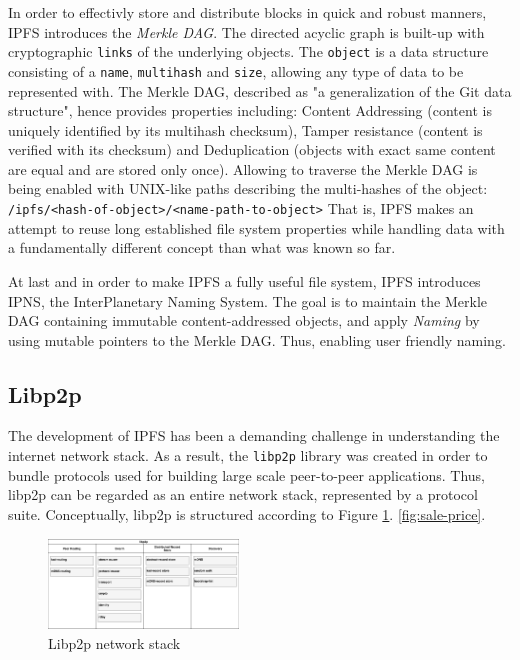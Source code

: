\documentclass[conference]{IEEEtran}
\begin{document}
In order to effectivly store and distribute blocks in quick and robust manners, IPFS introduces the \textit{Merkle DAG}.
The directed acyclic graph is built-up with cryptographic \texttt{links} of the underlying objects.
The \texttt{object} is a data structure consisting of a \texttt{name}, \texttt{multihash} and \texttt{size}, allowing any type of data to be represented with.
The Merkle DAG, described as "a generalization of the Git data structure"\cite{ipfs-whitepaper}, hence provides properties including: Content Addressing (content is uniquely identified by its multihash checksum), Tamper resistance (content is verified with its checksum) and Deduplication (objects with exact same content are equal and are stored only once). \cite{ipfs-whitepaper}
Allowing to traverse the Merkle DAG is being enabled with UNIX-like paths describing the multi-hashes of the object:\\
\texttt{/ipfs/<hash-of-object>/<name-path-to-object>}
That is, IPFS makes an attempt to reuse long established file system properties while handling data with a fundamentally different concept than what was known so far.

At last and in order to make IPFS a fully useful file system, IPFS introduces IPNS\cite{ipns}, the InterPlanetary Naming System.
The goal is to maintain the Merkle DAG containing immutable content-addressed objects, and apply \textit{Naming} by using mutable pointers to the Merkle DAG.
Thus, enabling user friendly naming. \cite{ipfs-whitepaper}

\subsection{Libp2p}
The development of IPFS has been a demanding challenge in understanding the internet network stack. \cite{libp2p-github}
As a result, the \texttt{libp2p} library was created in order to bundle protocols used for building large scale peer-to-peer applications.
Thus, libp2p can be regarded as an entire network stack, represented by a protocol suite.
Conceptually, libp2p is structured according to Figure \ref{fig:libp2p-stack}.
\ref{fig:sale-price}.
\begin{figure}[h]
\centering
\includegraphics[width=0.45\textwidth]{libp2p-short.png}
\caption{Libp2p network stack}
\label{fig:libp2p-stack}
\end{figure}
\end{document}
